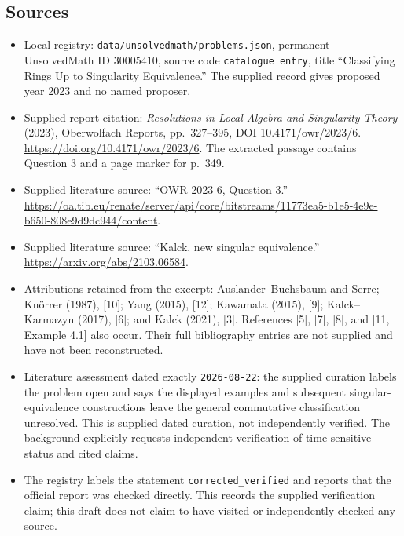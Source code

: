 \documentclass[11pt]{article}
\begin{document}
\subsection{Sources}
\begin{itemize}
\item Local registry: \texttt{data/unsolvedmath/problems.json}, permanent UnsolvedMath ID \(30005410\), source code \texttt{catalogue entry}, title ``Classifying Rings Up to Singularity Equivalence.'' The supplied record gives proposed year 2023 and no named proposer.
\item Supplied report citation: \emph{Resolutions in Local Algebra and Singularity Theory} (2023), Oberwolfach Reports, pp.~327--395, DOI 10.4171/owr/2023/6. \url{https://doi.org/10.4171/owr/2023/6}. The extracted passage contains Question 3 and a page marker for p.~349.
\item Supplied literature source: ``OWR-2023-6, Question 3.'' \url{https://oa.tib.eu/renate/server/api/core/bitstreams/11773ea5-b1e5-4e9e-b650-808e9d9dc944/content}.
\item Supplied literature source: ``Kalck, new singular equivalence.'' \url{https://arxiv.org/abs/2103.06584}.
\item Attributions retained from the excerpt: Auslander--Buchsbaum and Serre; Kn\"orrer (1987), [10]; Yang (2015), [12]; Kawamata (2015), [9]; Kalck--Karmazyn (2017), [6]; and Kalck (2021), [3]. References [5], [7], [8], and [11, Example 4.1] also occur. Their full bibliography entries are not supplied and have not been reconstructed.
\item Literature assessment dated exactly \texttt{2026-08-22}: the supplied curation labels the problem open and says the displayed examples and subsequent singular-equivalence constructions leave the general commutative classification unresolved. This is supplied dated curation, not independently verified. The background explicitly requests independent verification of time-sensitive status and cited claims.
\item The registry labels the statement \texttt{corrected\_verified} and reports that the official report was checked directly. This records the supplied verification claim; this draft does not claim to have visited or independently checked any source.
\end{itemize}
\end{document}
